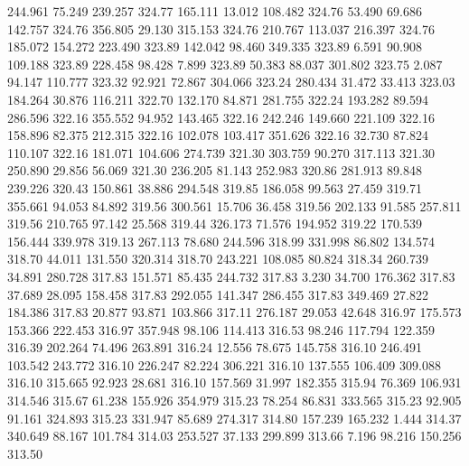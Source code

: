  244.961   75.249  239.257       324.77
 165.111   13.012  108.482       324.76
  53.490   69.686  142.757       324.76
 356.805   29.130  315.153       324.76
 210.767  113.037  216.397       324.76
 185.072  154.272  223.490       323.89
 142.042   98.460  349.335       323.89
   6.591   90.908  109.188       323.89
 228.458   98.428    7.899       323.89
  50.383   88.037  301.802       323.75
   2.087   94.147  110.777       323.32
  92.921   72.867  304.066       323.24
 280.434   31.472   33.413       323.03
 184.264   30.876  116.211       322.70
 132.170   84.871  281.755       322.24
 193.282   89.594  286.596       322.16
 355.552   94.952  143.465       322.16
 242.246  149.660  221.109       322.16
 158.896   82.375  212.315       322.16
 102.078  103.417  351.626       322.16
  32.730   87.824  110.107       322.16
 181.071  104.606  274.739       321.30
 303.759   90.270  317.113       321.30
 250.890   29.856   56.069       321.30
 236.205   81.143  252.983       320.86
 281.913   89.848  239.226       320.43
 150.861   38.886  294.548       319.85
 186.058   99.563   27.459       319.71
 355.661   94.053   84.892       319.56
 300.561   15.706   36.458       319.56
 202.133   91.585  257.811       319.56
 210.765   97.142   25.568       319.44
 326.173   71.576  194.952       319.22
 170.539  156.444  339.978       319.13
 267.113   78.680  244.596       318.99
 331.998   86.802  134.574       318.70
  44.011  131.550  320.314       318.70
 243.221  108.085   80.824       318.34
 260.739   34.891  280.728       317.83
 151.571   85.435  244.732       317.83
   3.230   34.700  176.362       317.83
  37.689   28.095  158.458       317.83
 292.055  141.347  286.455       317.83
 349.469   27.822  184.386       317.83
  20.877   93.871  103.866       317.11
 276.187   29.053   42.648       316.97
 175.573  153.366  222.453       316.97
 357.948   98.106  114.413       316.53
  98.246  117.794  122.359       316.39
 202.264   74.496  263.891       316.24
  12.556   78.675  145.758       316.10
 246.491  103.542  243.772       316.10
 226.247   82.224  306.221       316.10
 137.555  106.409  309.088       316.10
 315.665   92.923   28.681       316.10
 157.569   31.997  182.355       315.94
  76.369  106.931  314.546       315.67
  61.238  155.926  354.979       315.23
  78.254   86.831  333.565       315.23
  92.905   91.161  324.893       315.23
 331.947   85.689  274.317       314.80
 157.239  165.232    1.444       314.37
 340.649   88.167  101.784       314.03
 253.527   37.133  299.899       313.66
   7.196   98.216  150.256       313.50
